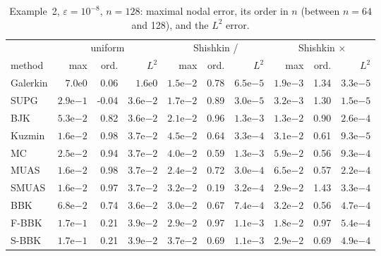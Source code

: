 \begin{table}[!htbp]
\centering\scriptsize\setlength{\tabcolsep}{3pt}
\caption{Example~2, $\varepsilon=10^{-8}$, $n=128$: maximal nodal error, its order in $n$ (between $n=64$ and 128), and the $L^2$ error.}\label{tab:acc-boundary_layers-1e-08}
\begin{tabular}{l rrr rrr rrr}
\toprule
 & \multicolumn{3}{c}{uniform} & \multicolumn{3}{c}{Shishkin /} & \multicolumn{3}{c}{Shishkin $\times$}\\
method & max & ord. & $L^2$ & max & ord. & $L^2$ & max & ord. & $L^2$\\
\midrule
Galerkin & $7.0\mathrm{e}{0}$ & 0.06 & $1.6\mathrm{e}{0}$ & $1.5\mathrm{e}{-2}$ & 0.78 & $6.5\mathrm{e}{-5}$ & $1.9\mathrm{e}{-3}$ & 1.34 & $3.3\mathrm{e}{-5}$ \\
SUPG & $2.9\mathrm{e}{-1}$ & -0.04 & $3.6\mathrm{e}{-2}$ & $1.7\mathrm{e}{-2}$ & 0.89 & $3.0\mathrm{e}{-5}$ & $3.2\mathrm{e}{-3}$ & 1.30 & $1.5\mathrm{e}{-5}$ \\
BJK & $5.3\mathrm{e}{-2}$ & 0.82 & $3.6\mathrm{e}{-2}$ & $2.1\mathrm{e}{-2}$ & 0.96 & $1.3\mathrm{e}{-3}$ & $1.3\mathrm{e}{-2}$ & 0.90 & $2.6\mathrm{e}{-4}$ \\
Kuzmin & $1.6\mathrm{e}{-2}$ & 0.98 & $3.7\mathrm{e}{-2}$ & $4.5\mathrm{e}{-2}$ & 0.64 & $3.3\mathrm{e}{-4}$ & $3.1\mathrm{e}{-2}$ & 0.61 & $9.3\mathrm{e}{-5}$ \\
MC & $2.5\mathrm{e}{-2}$ & 0.94 & $3.7\mathrm{e}{-2}$ & $4.0\mathrm{e}{-2}$ & 0.59 & $1.3\mathrm{e}{-3}$ & $5.9\mathrm{e}{-2}$ & 0.56 & $9.3\mathrm{e}{-4}$ \\
MUAS & $1.6\mathrm{e}{-2}$ & 0.98 & $3.7\mathrm{e}{-2}$ & $2.4\mathrm{e}{-2}$ & 0.72 & $3.0\mathrm{e}{-4}$ & $6.5\mathrm{e}{-2}$ & 0.57 & $2.2\mathrm{e}{-4}$ \\
SMUAS & $1.6\mathrm{e}{-2}$ & 0.97 & $3.7\mathrm{e}{-2}$ & $3.2\mathrm{e}{-2}$ & 0.19 & $3.2\mathrm{e}{-4}$ & $2.9\mathrm{e}{-2}$ & 1.43 & $3.3\mathrm{e}{-4}$ \\
BBK & $6.8\mathrm{e}{-2}$ & 0.74 & $3.6\mathrm{e}{-2}$ & $3.0\mathrm{e}{-2}$ & 0.67 & $7.4\mathrm{e}{-4}$ & $3.2\mathrm{e}{-2}$ & 0.56 & $4.7\mathrm{e}{-4}$ \\
F-BBK & $1.7\mathrm{e}{-1}$ & 0.21 & $3.9\mathrm{e}{-2}$ & $2.9\mathrm{e}{-2}$ & 0.97 & $1.1\mathrm{e}{-3}$ & $1.8\mathrm{e}{-2}$ & 0.97 & $5.4\mathrm{e}{-4}$ \\
S-BBK & $1.7\mathrm{e}{-1}$ & 0.21 & $3.9\mathrm{e}{-2}$ & $3.7\mathrm{e}{-2}$ & 0.69 & $1.1\mathrm{e}{-3}$ & $2.9\mathrm{e}{-2}$ & 0.69 & $4.9\mathrm{e}{-4}$ \\
\bottomrule
\end{tabular}
\end{table}
